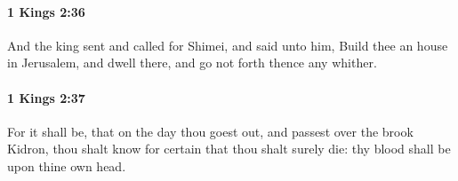 		\paragraph{1 Kings 2:36} %
			\label{1KINGS-2-36}

			And the king sent and called for Shimei, and said unto him, Build thee an house in Jerusalem, and dwell there, and go not forth thence any whither.


		\paragraph{1 Kings 2:37} %
			\label{1KINGS-2-37}

			For it shall be, that on the day thou goest out, and passest over the brook Kidron, thou shalt know for certain that thou shalt surely die: thy blood shall be upon thine own head.


